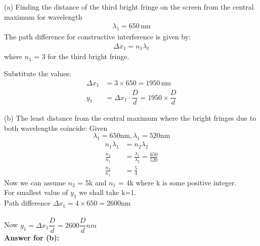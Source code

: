 \documentclass[journal,12pt,twocolumn]{IEEEtran}
\theoremstyle{remark}
\begin{document}
(a) Finding the distance of the third bright fringe on the screen from the central maximum for wavelength
\begin{align}
\lambda_1 = 650 \, \text{nm}
\end{align}
The path difference for constructive interference is given by:
\begin{align}
\Delta x_1 = n_1\lambda_1     
\end{align}
where  $n_1$ = 3  for the third bright fringe.

Substitute the values:
\begin{align}
\Delta x_1 &= 3\times650 = 1950 \, \text{nm} \\
y_1 &= \Delta x_1\cdot\dfrac{D}{d} = 1950\times\dfrac{D}{d}
\end{align}

(b) The least distance from the central maximum where the bright fringes due to both wavelengths coincide:
Given \[\lambda_1 = 650 \text{nm} ,\lambda_1 = 520 \text{nm}\]
\begin{align}
  n_1 \lambda_1 &= n_2\lambda_2 \\
\frac{n_2}{n_1} &= \frac{\lambda_1}{\lambda_2} = \frac{650}{520}\\
\frac{n_2}{n_1} &= \frac{5}{4}
\end{align}
Now we can assume $n_2$ = 5k and $n_1$ = 4k where k is some positive integer.\\
For smallest value of $y_1$ we shall take k=1.\\
Path difference $\Delta x_1 = 4\times650 = 2600 \text{nm}$\\\\
Now $y_1 =\Delta x_1 \dfrac{D}{d} = 2600\dfrac{D}{d}nm $\\
\textbf{Answer for (b):}
\\
\end{document}
